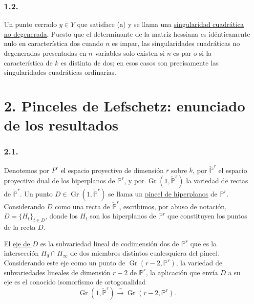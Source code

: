 \subsubsection*{1.2.}
Un punto cerrado $y\in Y$ que satisface (a) y  se llama una
\underline{singularidad cuadrática no degenerada}. Puesto que el
determinante de la matriz hessiana es idénticamente nulo en
característica dos cuando $n$ es impar, las singularidades cuadráticas
no degeneradas presentadas en $n$ variables solo existen si $n$ es
par o si la característica de $k$ es distinta de dos; en esos casos
son precisamente las singularidades cuadráticas ordinarias.

\pageoriginale

\section*{2. Pinceles de Lefschetz: enunciado de los resultados}

\subsubsection*{2.1.}
Denotemos por $P^r$ el espacio proyectivo de dimensión $r$
sobre $k$, por $\check{\mathbb P}^{r}$ el espacio proyectivo
\underline{dual} de los hiperplanos de $\mathbb P^r$, y por
$\operatorname{Gr}(1,\check{\mathbb P}^{r})$ la variedad de rectas
de $\check{\mathbb P}^{r}$. Un punto
$D\in\operatorname{Gr}(1,\check{\mathbb P}^{r})$ se llama un
\underline{pincel de hiperplanos} de $\mathbb P^r$. Considerando $D$
como una recta de $\check{\mathbb P}^{r}$, escribimos, por abuso de
notación, $D=\{H_t\}_{t\in D}$, donde los $H_t$ son los hiperplanos
de $\mathbb P^r$ que constituyen los puntos de la recta $D$.

El \underline{eje de $D$} es la subvariedad lineal de codimensión dos
de $\mathbb P^r$ que es la intersección $H_0\cap H_\infty$ de dos
miembros distintos cualesquiera del pincel. Considerando este eje
como un punto de $\operatorname{Gr}(r-2,\mathbb P^r)$, la variedad de
subvariedades lineales de dimensión $r-2$ de $\mathbb P^r$, la
aplicación que envía $D$ a su eje es el conocido isomorfismo de
ortogonalidad
\[
\operatorname{Gr}(1,\check{\mathbb P}^{r})
\xrightarrow{\ \sim\ }
\operatorname{Gr}(r-2,\mathbb P^r).
\]


